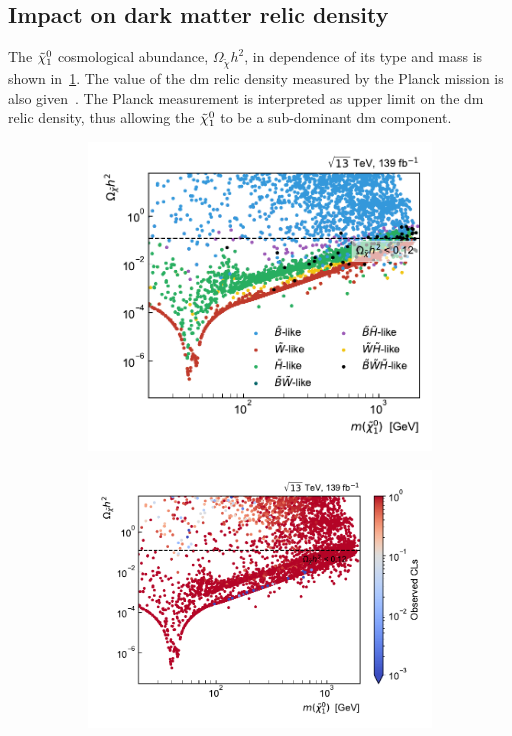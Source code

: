 \subsection{Impact on dark matter relic density}

The $\tilde{\chi}_1^0$ cosmological abundance, $\Omega_{\tilde{\chi}} h^2$, in dependence of its type and mass is shown in~\cref{fig:relic_density_lsp}. The value of the \gls{dm} relic density measured by the Planck mission is also given~\cite{Planck}. The Planck measurement is interpreted as upper limit on the \gls{dm} relic density, thus allowing the $\tilde{\chi}_1^0$ to be a sub-dominant \gls{dm} component.

 \begin{figure}
	\captionsetup[subfigure]{aboveskip=-3pt,belowskip=0pt}
	\centering
	\begin{subfigure}[b]{0.455\linewidth}
		\centering\includegraphics[width=\textwidth]{scatter/relic_density_lsp}
		\caption{\label{fig:relic_density_lsp}}
	\end{subfigure}\hfill
	\begin{subfigure}[b]{0.545\linewidth}
		\centering\includegraphics[width=\textwidth]{scatter/relic_density_lsp_cls}

\end{subfigure}
\end{figure}
